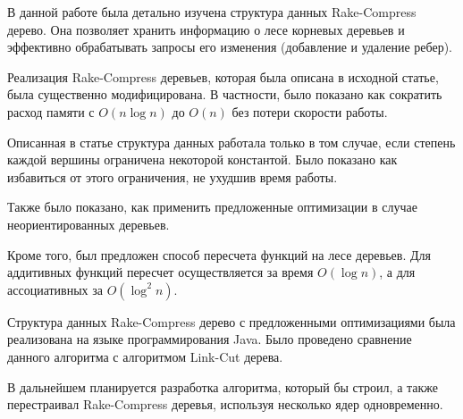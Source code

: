 \startconclusionpage

В данной работе была детально изучена структура данных Rake-Compress дерево. 
Она позволяет хранить информацию о лесе корневых деревьев и эффективно обрабатывать запросы его изменения (добавление и удаление ребер).

Реализация Rake-Compress деревьев, которая была описана в исходной статье, была существенно модифицирована. 
В частности, было показано как сократить расход памяти с $O(n \log n)$ до $O(n)$ без потери скорости работы.

Описанная в статье структура данных работала только в том случае, если степень каждой вершины ограничена некоторой константой. 
Было показано как избавиться от этого ограничения, не ухудшив время работы.

Также было показано, как применить предложенные оптимизации в случае неориентированных деревьев. 

Кроме того, был предложен способ пересчета функций на лесе деревьев. 
Для аддитивных функций пересчет осуществляется за время $O(\log n)$, а для ассоциативных за $O(\log^2 n)$.

Структура данных Rake-Compress дерево с предложенными оптимизациями была реализована на языке программирования Java. 
Было проведено сравнение данного алгоритма с алгоритмом Link-Cut дерева.

В дальнейшем планируется разработка алгоритма, который бы строил, а также перестраивал Rake-Compress деревья, используя несколько ядер одновременно.

\FloatBarrier
